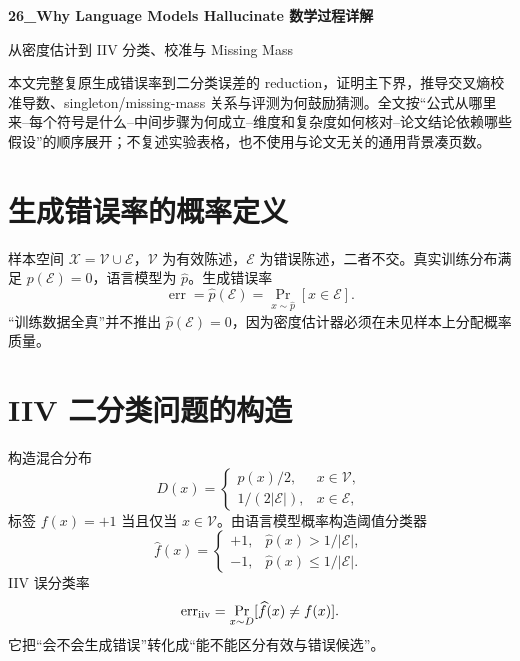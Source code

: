 \documentclass[UTF8,12pt,a4paper,fontset=none]{ctexart}
\numberwithin{equation}{section}
\begin{document}
\begin{center}
{\LARGE\bfseries 26\_Why Language Models Hallucinate 数学过程详解}\par
\vspace{0.35em}
{\large 从密度估计到 IIV 分类、校准与 Missing Mass}
\end{center}
\vspace{0.45em}
\begin{keybox}[本文只处理真正需要推导的部分]
本文完整复原生成错误率到二分类误差的 reduction，证明主下界，推导交叉熵校准导数、singleton/missing-mass 关系与评测为何鼓励猜测。全文按“公式从哪里来--每个符号是什么--中间步骤为何成立--维度和复杂度如何核对--论文结论依赖哪些假设”的顺序展开；不复述实验表格，也不使用与论文无关的通用背景凑页数。
\end{keybox}
\tableofcontents
\newpage

\section{生成错误率的概率定义}
样本空间 $\mathcal X=\mathcal V\cup\mathcal E$，$\mathcal V$ 为有效陈述，$\mathcal E$ 为错误陈述，二者不交。真实训练分布满足 $p(\mathcal E)=0$，语言模型为 $\widehat p$。生成错误率
\begin{equation}
 \boxed{\operatorname{err}=\widehat p(\mathcal E)=\Pr_{x\sim\widehat p}[x\in\mathcal E]}.
\end{equation}
“训练数据全真”并不推出 $\widehat p(\mathcal E)=0$，因为密度估计器必须在未见样本上分配概率质量。

\section{IIV 二分类问题的构造}
构造混合分布
\begin{equation}
 D(x)=\begin{cases}
 p(x)/2,&x\in\mathcal V,\\
 1/(2|\mathcal E|),&x\in\mathcal E,
 \end{cases}
\end{equation}
标签 $f(x)=+1$ 当且仅当 $x\in\mathcal V$。由语言模型概率构造阈值分类器
\begin{equation}
 \widehat f(x)=\begin{cases}
 +1,&\widehat p(x)>1/|\mathcal E|,\\
 -1,&\widehat p(x)\le1/|\mathcal E|.
 \end{cases}
\end{equation}
IIV 误分类率
\begin{equation}
 \operatorname{err}_{\rm iiv}=\Pr_{x\sim D}[\widehat f(x)\ne f(x)].
\end{equation}
它把“会不会生成错误”转化成“能不能区分有效与错误候选”。
\end{document}
